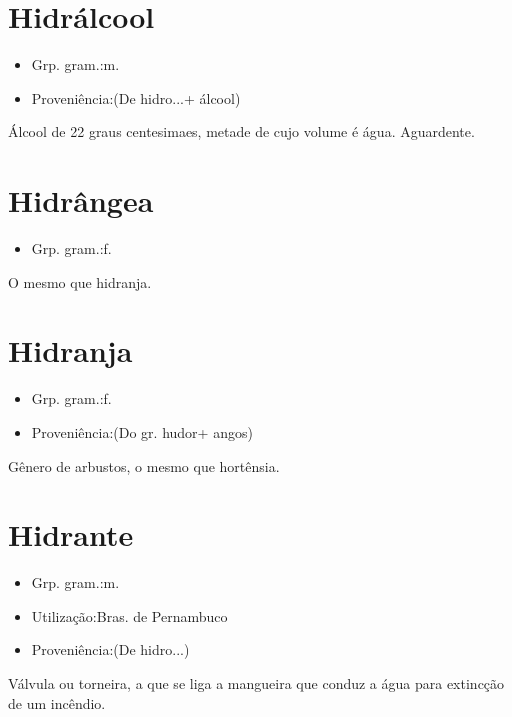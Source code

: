 \documentclass{article}
\begin{document}
\section{Hidrálcool}
\begin{itemize}
\item {Grp. gram.:m.}
\end{itemize}
\begin{itemize}
\item {Proveniência:(De \textunderscore hidro...\textunderscore  + \textunderscore álcool\textunderscore )}
\end{itemize}
Álcool de 22 graus centesimaes, metade de cujo volume é água.
Aguardente.
\section{Hidrângea}
\begin{itemize}
\item {Grp. gram.:f.}
\end{itemize}
O mesmo que \textunderscore hidranja\textunderscore .
\section{Hidranja}
\begin{itemize}
\item {Grp. gram.:f.}
\end{itemize}
\begin{itemize}
\item {Proveniência:(Do gr. \textunderscore hudor\textunderscore  + \textunderscore angos\textunderscore )}
\end{itemize}
Gênero de arbustos, o mesmo que \textunderscore hortênsia\textunderscore .
\section{Hidrante}
\begin{itemize}
\item {Grp. gram.:m.}
\end{itemize}
\begin{itemize}
\item {Utilização:Bras. de Pernambuco}
\end{itemize}
\begin{itemize}
\item {Proveniência:(De \textunderscore hidro...\textunderscore )}
\end{itemize}
Válvula ou torneira, a que se liga a mangueira que conduz a água para extincção de um incêndio.
\end{document}
